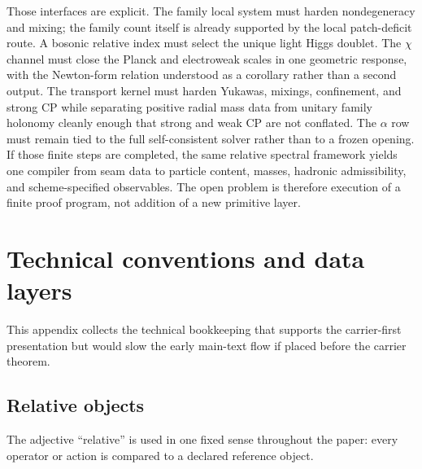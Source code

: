 Those interfaces are explicit. The family local system must harden nondegeneracy and mixing; the family count itself is already supported by the local patch-deficit route. A bosonic relative index must select the unique light Higgs doublet. The $\chi$ channel must close the Planck and electroweak scales in one geometric response, with the Newton-form relation understood as a corollary rather than a second output. The transport kernel must harden Yukawas, mixings, confinement, and strong CP while separating positive radial mass data from unitary family holonomy cleanly enough that strong and weak CP are not conflated. The $\alpha$ row must remain tied to the full self-consistent solver rather than to a frozen opening. If those finite steps are completed, the same relative spectral framework yields one compiler from seam data to particle content, masses, hadronic admissibility, and scheme-specified observables. The open problem is therefore execution of a finite proof program, not addition of a new primitive layer.

\appendix

\section{Technical conventions and data layers}
\label{app:tech}

This appendix collects the technical bookkeeping that supports the carrier-first presentation but would slow the early main-text flow if placed before the carrier theorem.

\subsection{Relative objects}

The adjective \enquote{relative} is used in one fixed sense throughout the paper: every operator or action is compared to a declared reference object.

